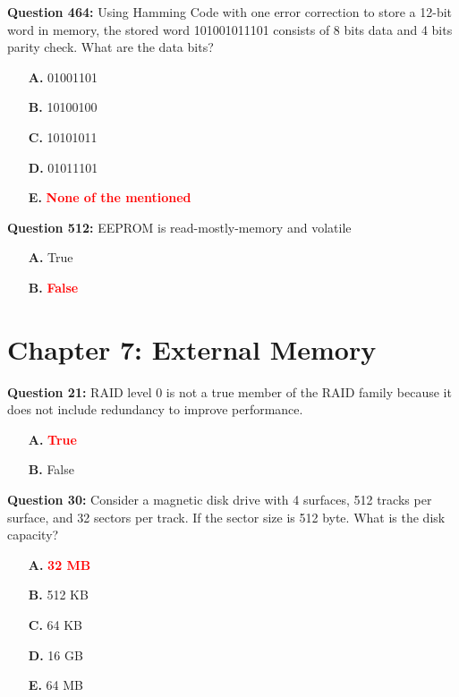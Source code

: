 \documentclass[12pt,a4paper]{article}
\begin{document}
\vspace{0.5cm}

\textbf{Question 464:} Using Hamming Code with one error correction to store a 12-bit word in memory, the stored word 101001011101 consists of 8 bits data and 4 bits parity check. What are the data bits?

\begin{itemize}
    \item[\textbf{A.}] 01001101
    \item[\textbf{B.}] 10100100
    \item[\textbf{C.}] 10101011
    \item[\textbf{D.}] 01011101
    \item[\textbf{E.}] \textcolor{red}{\textbf{None of the mentioned}}
\end{itemize}

\vspace{0.5cm}

\textbf{Question 512:} EEPROM is read-mostly-memory and volatile

\begin{itemize}
    \item[\textbf{A.}] True
    \item[\textbf{B.}] \textcolor{red}{\textbf{False}}
\end{itemize}

\vspace{0.5cm}

\section{Chapter 7: External Memory}

\textbf{Question 21:} RAID level 0 is not a true member of the RAID family because it does not include redundancy to improve performance.

\begin{itemize}
    \item[\textbf{A.}] \textcolor{red}{\textbf{True}}
    \item[\textbf{B.}] False
\end{itemize}

\vspace{0.5cm}

\textbf{Question 30:} Consider a magnetic disk drive with 4 surfaces, 512 tracks per surface, and 32 sectors per track. If the sector size is 512 byte. What is the disk capacity?

\begin{itemize}
    \item[\textbf{A.}] \textcolor{red}{\textbf{32 MB}}
    \item[\textbf{B.}] 512 KB
    \item[\textbf{C.}] 64 KB
    \item[\textbf{D.}] 16 GB
    \item[\textbf{E.}] 64 MB
\end{itemize}
\end{document}

